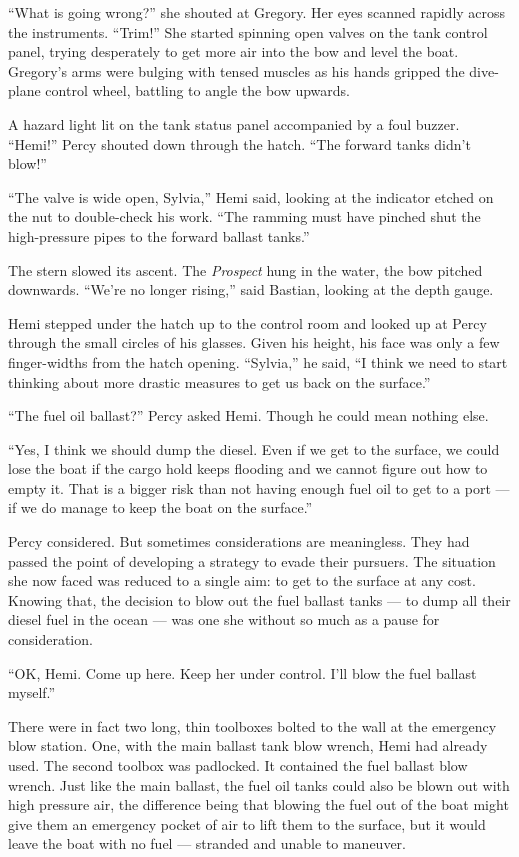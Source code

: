 \documentclass[
]{scrbook}
\begin{document}
``What is going wrong?'' she shouted at Gregory. Her eyes scanned
rapidly across the instruments. ``Trim!'' She started spinning open
valves on the tank control panel, trying desperately to get more air
into the bow and level the boat. Gregory's arms were bulging with tensed
muscles as his hands gripped the dive-plane control wheel, battling to
angle the bow upwards.

A hazard light lit on the tank status panel accompanied by a foul
buzzer. ``Hemi!'' Percy shouted down through the hatch. ``The forward
tanks didn't blow!''

``The valve is wide open, Sylvia,'' Hemi said, looking at the indicator
etched on the nut to double-check his work. ``The ramming must have
pinched shut the high-pressure pipes to the forward ballast tanks.''

The stern slowed its ascent. The \emph{Prospect} hung in the water, the
bow pitched downwards. ``We're no longer rising,'' said Bastian, looking
at the depth gauge.

Hemi stepped under the hatch up to the control room and looked up at
Percy through the small circles of his glasses. Given his height, his
face was only a few finger-widths from the hatch opening. ``Sylvia,'' he
said, ``I think we need to start thinking about more drastic measures to
get us back on the surface.''

``The fuel oil ballast?'' Percy asked Hemi. Though he could mean nothing
else.

``Yes, I think we should dump the diesel. Even if we get to the surface,
we could lose the boat if the cargo hold keeps flooding and we cannot
figure out how to empty it. That is a bigger risk than not having enough
fuel oil to get to a port --- if we do manage to keep the boat on the
surface.''

Percy considered. But sometimes considerations are meaningless. They had
passed the point of developing a strategy to evade their pursuers. The
situation she now faced was reduced to a single aim: to get to the
surface at any cost. Knowing that, the decision to blow out the fuel
ballast tanks --- to dump all their diesel fuel in the ocean --- was one
she without so much as a pause for consideration.

``OK, Hemi. Come up here. Keep her under control. I'll blow the fuel
ballast myself.''

There were in fact two long, thin toolboxes bolted to the wall at the
emergency blow station. One, with the main ballast tank blow wrench,
Hemi had already used. The second toolbox was padlocked. It contained
the fuel ballast blow wrench. Just like the main ballast, the fuel oil
tanks could also be blown out with high pressure air, the difference
being that blowing the fuel out of the boat might give them an emergency
pocket of air to lift them to the surface, but it would leave the boat
with no fuel --- stranded and unable to maneuver.
\end{document}
